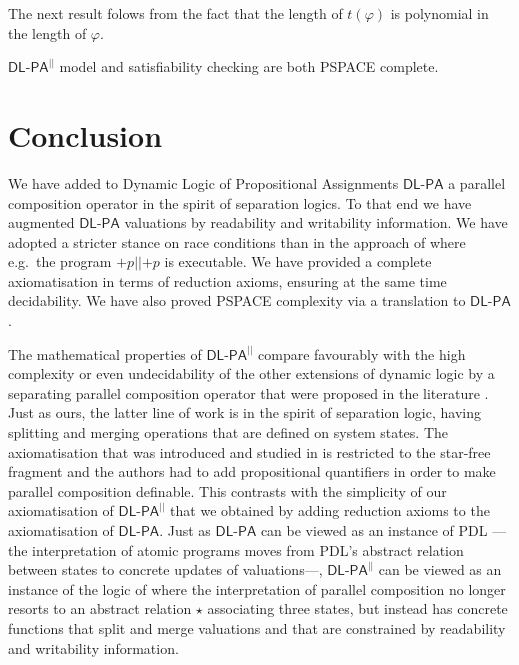 \documentclass{llncs}
\newcommand{\pll}{ {||} }							%
\newcommand{\Dlpa}{\ensuremath{\mathsf{DL\text{-}PA}}\xspace}
\newcommand{\DlpaPll}{\ensuremath{\mathsf{DL\text{-}PA}^\pll}\xspace}
\newcommand{\assgntop}[1]{{\mathtt {+} #1}}
\renewcommand{\phi}{\varphi}
\begin{document}
The next result folows from the fact that the length of $t(\phi)$ is polynomial in the length of $\phi$. 

\begin{theorem}
\DlpaPll model and satisfiability checking are both PSPACE complete.
\end{theorem}


\section{Conclusion}\label{sec:conclusion}

We have added to Dynamic Logic of Propositional Assignments \Dlpa
a parallel composition operator in the spirit of separation logics. 
To that end we have augmented \Dlpa valuations by readability and writability information. 
We have adopted a stricter stance on race conditions than in the approach of \cite{HerzigEtal-Ijcai19} 
where e.g.\ the program $\assgntop p \pll \assgntop p$ is executable.
We have provided a complete axiomatisation in terms of reduction axioms, 
ensuring at the same time decidability. 
We have also proved PSPACE complexity via a translation to \Dlpa. 

The mathematical properties of \DlpaPll compare favourably with 
the high complexity or even undecidability of the 
other extensions of dynamic logic by a separating parallel composition operator that were proposed in the literature
\cite{BalbianiT14,Boudou16}.
Just as ours, the latter line of work is in the spirit of separation logic, having splitting and merging operations that are defined on system states. 
The axiomatisation that was introduced and studied in \cite{DBLP:journals/logcom/BalbianiB18} is restricted to the star-free fragment and the authors had to add propositional quantifiers in order to make parallel composition definable. 
This contrasts with the simplicity of our axiomatisation of \DlpaPll that we obtained by adding reduction axioms to the axiomatisation of \Dlpa. 
Just as \Dlpa can be viewed as an instance of PDL%
---the interpretation of atomic programs moves from PDL's abstract relation between states to concrete updates of valuations\mbox{---,}
\DlpaPll can be viewed as an instance of the logic of \cite{DBLP:journals/entcs/BenevidesFV11}
where the interpretation of parallel composition no longer resorts to
an abstract relation $\star$ associating three states, 
but instead has concrete functions that split and merge valuations and that are constrained by readability and writability information. 
\end{document}
